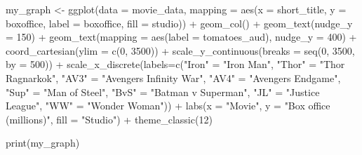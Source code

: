 \documentclass[
]{krantz}
\makeatletter
\newenvironment{Shaded}{\begin{snugshade}}{\end{snugshade}}
\newcommand{\AttributeTok}[1]{\textcolor[rgb]{0.61,0.61,0.61}{#1}}
\newcommand{\DecValTok}[1]{\textcolor[rgb]{0.06,0.06,0.06}{#1}}
\newcommand{\FunctionTok}[1]{\textcolor[rgb]{0,0,0}{#1}}
\newcommand{\NormalTok}[1]{#1}
\newcommand{\OtherTok}[1]{\textcolor[rgb]{0.37,0.37,0.37}{#1}}
\newcommand{\SpecialCharTok}[1]{\textcolor[rgb]{0,0,0}{#1}}
\newcommand{\StringTok}[1]{\textcolor[rgb]{0.5,0.5,0.5}{#1}}
\newenvironment{kframe}{%
\medskip{}
\setlength{\fboxsep}{.8em}
 \def\at@end@of@kframe{}%
 \ifinner\ifhmode%
  \def\at@end@of@kframe{\end{minipage}}%
  \begin{minipage}{\columnwidth}%
 \fi\fi%
 \def\FrameCommand##1{\hskip\@totalleftmargin \hskip-\fboxsep
 \colorbox{shadecolor}{##1}\hskip-\fboxsep
     \hskip-\linewidth \hskip-\@totalleftmargin \hskip\columnwidth}%
 \MakeFramed {\advance\hsize-\width
   \@totalleftmargin\z@ \linewidth\hsize
   \@setminipage}}%
 {\par\unskip\endMakeFramed%
 \at@end@of@kframe}
\renewenvironment{Shaded}{\begin{kframe}}{\end{kframe}}
\makeatother
\begin{document}
\begin{Shaded}
\begin{Highlighting}[]
\NormalTok{my\_graph }\OtherTok{\textless{}{-}} \FunctionTok{ggplot}\NormalTok{(}\AttributeTok{data =}\NormalTok{ movie\_data,}
           \AttributeTok{mapping =} \FunctionTok{aes}\NormalTok{(}\AttributeTok{x =}\NormalTok{ short\_title,}
                         \AttributeTok{y =}\NormalTok{ boxoffice,}
                         \AttributeTok{label =}\NormalTok{ boxoffice, }
                         \AttributeTok{fill =}\NormalTok{ studio)) }\SpecialCharTok{+}
  \FunctionTok{geom\_col}\NormalTok{() }\SpecialCharTok{+}
  \FunctionTok{geom\_text}\NormalTok{(}\AttributeTok{nudge\_y =} \DecValTok{150}\NormalTok{)  }\SpecialCharTok{+}
  \FunctionTok{geom\_text}\NormalTok{(}\AttributeTok{mapping =} \FunctionTok{aes}\NormalTok{(}\AttributeTok{label =}\NormalTok{ tomatoes\_aud), }
            \AttributeTok{nudge\_y =} \DecValTok{400}\NormalTok{) }\SpecialCharTok{+}
  \FunctionTok{coord\_cartesian}\NormalTok{(}\AttributeTok{ylim =} \FunctionTok{c}\NormalTok{(}\DecValTok{0}\NormalTok{, }\DecValTok{3500}\NormalTok{)) }\SpecialCharTok{+}
  \FunctionTok{scale\_y\_continuous}\NormalTok{(}\AttributeTok{breaks =} \FunctionTok{seq}\NormalTok{(}\DecValTok{0}\NormalTok{, }\DecValTok{3500}\NormalTok{, }\AttributeTok{by =} \DecValTok{500}\NormalTok{)) }\SpecialCharTok{+}
  \FunctionTok{scale\_x\_discrete}\NormalTok{(}\AttributeTok{labels=}\FunctionTok{c}\NormalTok{(}\StringTok{"Iron"} \OtherTok{=} \StringTok{"Iron Man"}\NormalTok{, }
                            \StringTok{"Thor"} \OtherTok{=} \StringTok{"Thor Ragnarkok"}\NormalTok{,}
                            \StringTok{"AV3"} \OtherTok{=} \StringTok{"Avengers Infinity War"}\NormalTok{,}
                            \StringTok{"AV4"} \OtherTok{=} \StringTok{"Avengers Endgame"}\NormalTok{,}
                            \StringTok{"Sup"} \OtherTok{=} \StringTok{"Man of Steel"}\NormalTok{,}
                            \StringTok{"BvS"} \OtherTok{=} \StringTok{"Batman v Superman"}\NormalTok{,}
                            \StringTok{"JL"} \OtherTok{=} \StringTok{"Justice League"}\NormalTok{,}
                            \StringTok{"WW"} \OtherTok{=} \StringTok{"Wonder Woman"}\NormalTok{)) }\SpecialCharTok{+}
  \FunctionTok{labs}\NormalTok{(}\AttributeTok{x =} \StringTok{"Movie"}\NormalTok{,}
       \AttributeTok{y =} \StringTok{"Box office (millions)"}\NormalTok{,}
       \AttributeTok{fill =} \StringTok{"Studio"}\NormalTok{) }\SpecialCharTok{+}
  \FunctionTok{theme\_classic}\NormalTok{(}\DecValTok{12}\NormalTok{)}
  

\FunctionTok{print}\NormalTok{(my\_graph)}
\end{Highlighting}
\end{Shaded}
\end{document}
